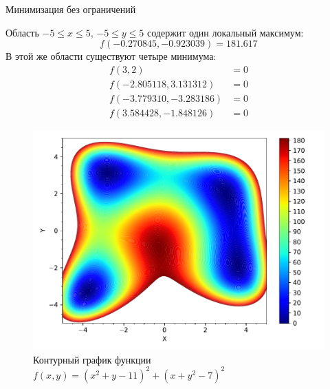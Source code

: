 \documentclass[aspectratio=169, mathserif]{beamer}	%
\begin{document}
\begin{frame}[fragile]{Минимизация без ограничений}
\scriptsize
\begin{minipage}{.4\textwidth}
Область $-5 \leqslant x \leqslant 5$, $-5 \leqslant y \leqslant 5$ содержит один локальный максимум:
\vfill
$$
	f\left(-0.270845, -0.923039\right) = 181.617
$$
\vfill
В этой же области существуют четыре минимума:
\vfill
\begin{equation*}
\begin{aligned}
	f\left(3, 2\right) &= 0 \\
	f\left(-2.805118, 3.131312\right) &= 0 \\
	f\left(-3.779310, -3.283186\right) &= 0 \\
	f\left(3.584428, -1.848126\right) &= 0
\end{aligned}
\end{equation*}
\vfill
\end{minipage}
\begin{minipage}{.59\textwidth}
\begin{figure}[h!]
\includegraphics[width=\textwidth]{./pics/contour2}
\caption{Контурный график функции $f\left(x, y\right) = \left(x^2 + y - 11\right)^2 + \left(x + y^2 - 7\right)^2$}
\label{fig:contour2}
\end{figure}
\end{minipage}
\vfill
\end{frame}
\end{document}

